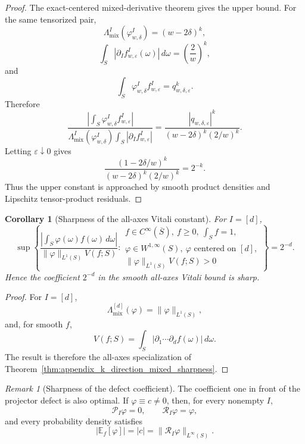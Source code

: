 \documentclass[11pt,letterpaper]{article}
\newtheorem{corollary}[theorem]{Corollary}
\theoremstyle{definition}
\theoremstyle{remark}
\newtheorem{remark}[theorem]{Remark}
\begin{document}
\begin{proof}
The exact-centered mixed-derivative theorem gives the upper bound. For the
same tensorized pair,
$$
\Lambda_{\mathrm{mix}}^I(\varphi_{w,\delta}^I)
=(w-2\delta)^k,
$$
$$
\int_S|\partial_I f_{w,\varepsilon}^I(\omega)|\,d\omega
=\left(\frac2w\right)^k,
$$
and
$$
\int_S\varphi_{w,\delta}^If_{w,\varepsilon}^I
=q_{w,\delta,\varepsilon}^k.
$$
Therefore
$$
\frac{
\left|\int_S\varphi_{w,\delta}^If_{w,\varepsilon}^I\right|
}
{
\Lambda_{\mathrm{mix}}^I(\varphi_{w,\delta}^I)
\int_S|\partial_I f_{w,\varepsilon}^I|
}
=
\frac{|q_{w,\delta,\varepsilon}|^k}
{(w-2\delta)^k(2/w)^k}.
$$
Letting $\varepsilon\downarrow0$ gives
$$
\frac{(1-2\delta/w)^k}
{(w-2\delta)^k(2/w)^k}
=
2^{-k}.
$$
Thus the upper constant is approached by smooth product densities and
Lipschitz tensor-product residuals.
\end{proof}

\begin{corollary}[Sharpness of the all-axes Vitali constant]
\label{cor:appendix_vitali_sharpness}
For $I=[d]$,
\begin{equation}
\label{eq:appendix_vitali_sharpness_supremum}
\sup
\left\{
\frac{
\left|\int_S\varphi(\omega)f(\omega)\,d\omega\right|
}
{\|\varphi\|_{L^1(S)}V(f;S)}:
\begin{array}{l}
f\in C^\infty(\overline S),\ f\ge0,\ \int_Sf=1,\\
\varphi\in W^{1,\infty}(S),\ \varphi\text{ centered on }[d],\\
\|\varphi\|_{L^1(S)}V(f;S)>0
\end{array}
\right\}
=
2^{-d}.
\end{equation}
Hence the coefficient $2^{-d}$ in the smooth all-axes Vitali bound is sharp.
\end{corollary}

\begin{proof}
For $I=[d]$,
$$
\Lambda_{\mathrm{mix}}^{[d]}(\varphi)=\|\varphi\|_{L^1(S)},
$$
and, for smooth $f$,
$$
V(f;S)=\int_S|\partial_1\cdots\partial_df(\omega)|\,d\omega.
$$
The result is therefore the all-axes specialization of
Theorem~\ref{thm:appendix_k_direction_mixed_sharpness}.
\end{proof}

\begin{remark}[Sharpness of the defect coefficient]
\label{rem:appendix_defect_coefficient_sharp}
The coefficient one in front of the projector defect is also optimal. If
$\varphi\equiv c\neq0$, then, for every nonempty $I$,
$$
\mathcal P_I\varphi=0,
\qquad
\mathcal R_I\varphi=\varphi,
$$
and every probability density satisfies
$$
|\mathbb E_f[\varphi]|
=|c|
=\|\mathcal R_I\varphi\|_{L^\infty(S)}.
$$
\end{remark}
\end{document}
